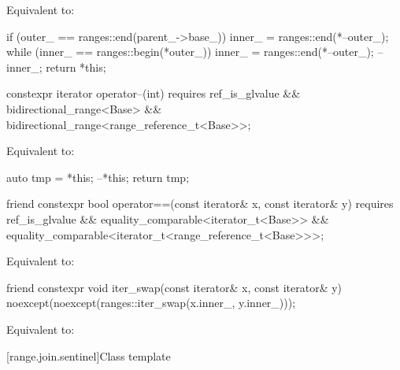 \begin{itemdescr}
\pnum
\effects Equivalent to:
\begin{codeblock}
if (outer_ == ranges::end(parent_->base_))
  inner_ = ranges::end(*--outer_);
while (inner_ == ranges::begin(*outer_))
  inner_ = ranges::end(*--outer_);
--inner_;
return *this;
\end{codeblock}
\end{itemdescr}

\begin{itemdecl}
constexpr iterator operator--(int)
  requires ref_is_glvalue && bidirectional_range<Base> &&
           bidirectional_range<range_reference_t<Base>>;
\end{itemdecl}

\begin{itemdescr}
\pnum
\effects Equivalent to:
\begin{codeblock}
auto tmp = *this;
--*this;
return tmp;
\end{codeblock}
\end{itemdescr}

\begin{itemdecl}
friend constexpr bool operator==(const iterator& x, const iterator& y)
  requires ref_is_glvalue && equality_comparable<iterator_t<Base>> &&
           equality_comparable<iterator_t<range_reference_t<Base>>>;
\end{itemdecl}

\begin{itemdescr}
\pnum
\effects Equivalent to:
\end{itemdescr}

\begin{itemdecl}
friend constexpr void iter_swap(const iterator& x, const iterator& y)
  noexcept(noexcept(ranges::iter_swap(x.inner_, y.inner_)));
\end{itemdecl}

\begin{itemdescr}
\pnum
\effects Equivalent to: 
\end{itemdescr}

[range.join.sentinel]{Class template }


